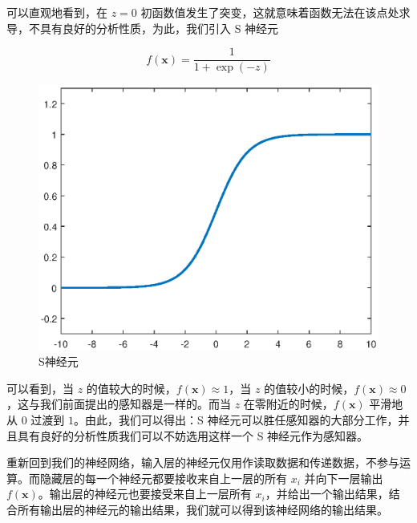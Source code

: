 \documentclass{ctexart}
\numberwithin{equation}{section}    %
\begin{document}
可以直观地看到，在 $z=0$ 初函数值发生了突变，这就意味着函数无法在该点处求导，不具有良好的分析性质，为此，我们引入 S 神经元

\begin{equation}
    f(\mathbf{x})= \frac{1}{1+\exp(-z)}
\end{equation}

\begin{figure}[htp]
    \centering
    \includegraphics[width=0.7\linewidth]{fig/S神经元}
    \caption{S神经元}
\end{figure}

可以看到，当 $z$ 的值较大的时候，$f(\mathbf{x})\approx1$，当 $z$ 的值较小的时候，$f(\mathbf{x})\approx0$，这与我们前面提出的感知器是一样的。而当 $ z $ 在零附近的时候，$f(\mathbf{x})$ 平滑地从 $0$ 过渡到 $1$。由此，我们可以得出：S 神经元可以胜任感知器的大部分工作，并且具有良好的分析性质我们可以不妨选用这样一个 S 神经元作为感知器。

重新回到我们的神经网络，输入层的神经元仅用作读取数据和传递数据，不参与运算。而隐藏层的每一个神经元都要接收来自上一层的所有 $x_i$ 并向下一层输出 $f(\mathbf{x})$。输出层的神经元也要接受来自上一层所有 $x_i$，并给出一个输出结果，结合所有输出层的神经元的输出结果，我们就可以得到该神经网络的输出结果。
\end{document}
